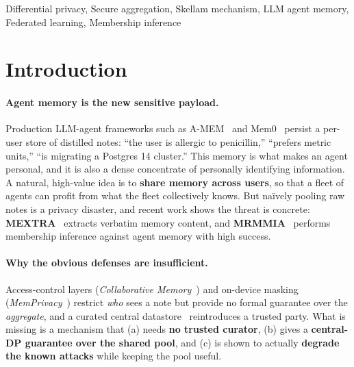 \documentclass[conference]{IEEEtran}
\theoremstyle{remark}
\begin{document}
\begin{IEEEkeywords}
Differential privacy, Secure aggregation, Skellam mechanism, LLM agent memory, Federated learning, Membership inference
\end{IEEEkeywords}

\section{Introduction}\label{sec:intro}

\paragraph{Agent memory is the new sensitive payload.} Production LLM-agent frameworks such as A-MEM~\cite{xu2024amem} and Mem0~\cite{chhikara2024mem0} persist a per-user store of distilled notes: ``the user is allergic to penicillin,'' ``prefers metric units,'' ``is migrating a Postgres 14 cluster.'' This memory is what makes an agent personal, and it is also a dense concentrate of personally identifying information. A natural, high-value idea is to \textbf{share memory across users}, so that a fleet of agents can profit from what the fleet collectively knows. But na\"ively pooling raw notes is a privacy disaster, and recent work shows the threat is concrete: \textbf{MEXTRA}~\cite{wang2025mextra} extracts verbatim memory content, and \textbf{MRMMIA}~\cite{chen2026mrmmia} performs membership inference against agent memory with high success.

\paragraph{Why the obvious defenses are insufficient.} Access-control layers (\emph{Collaborative Memory}~\cite{rezazadeh2025collabmem}) and on-device masking (\emph{MemPrivacy}~\cite{chen2026memprivacy}) restrict \emph{who} sees a note but provide no formal guarantee over the \emph{aggregate}, and a curated central datastore~\cite{abouelenein2026dpdatastore} reintroduces a trusted party. What is missing is a mechanism that (a) needs \textbf{no trusted curator}, (b) gives a \textbf{central-DP guarantee over the shared pool}, and (c) is shown to actually \textbf{degrade the known attacks} while keeping the pool useful.
\end{document}
